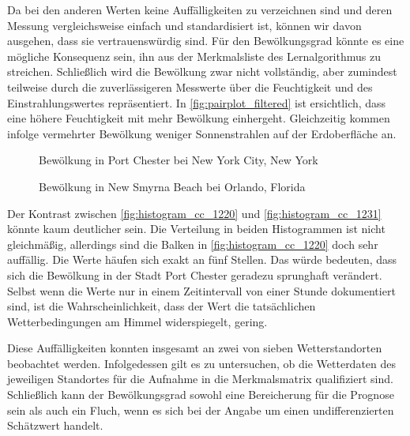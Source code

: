 \documentclass[12pt, a4paper]{article}
\begin{document}
Da bei den anderen Werten keine Auffälligkeiten zu verzeichnen sind und deren Messung vergleichsweise einfach und standardisiert ist, können wir davon ausgehen, dass sie vertrauenswürdig sind. Für den Bewölkungsgrad könnte es eine mögliche Konsequenz sein, ihn aus der Merkmalsliste des Lernalgorithmus zu streichen. Schließlich wird die Bewölkung zwar nicht vollständig, aber zumindest teilweise durch die zuverlässigeren Messwerte über die Feuchtigkeit und des Einstrahlungswertes repräsentiert. In \autoref{fig:pairplot_filtered} ist ersichtlich, dass eine höhere Feuchtigkeit mit mehr Bewölkung einhergeht. Gleichzeitig kommen infolge vermehrter Bewölkung weniger Sonnenstrahlen auf der Erdoberfläche an. 

\begin{figure}
\centering
\begin{minipage}[t]{0.45\linewidth}
\centering
\def\svgwidth{210pt}

\caption{Bewölkung in Port Chester bei New York City, New York}
\label{fig:histogram_cc_1220}
\end{minipage}
\hfill
\begin{minipage}[t]{0.45\linewidth}
\centering
\def\svgwidth{200pt}

\caption{Bewölkung in New Smyrna Beach bei Orlando, Florida}
\label{fig:histogram_cc_1231}
\end{minipage}
\end {figure}


Der Kontrast zwischen \autoref{fig:histogram_cc_1220} und \autoref{fig:histogram_cc_1231} könnte kaum deutlicher sein. Die Verteilung in beiden Histogrammen ist nicht gleichmäßig, allerdings sind die Balken in \autoref{fig:histogram_cc_1220} doch sehr auffällig. Die Werte häufen sich exakt an fünf Stellen. Das würde bedeuten, dass sich die Bewölkung in der Stadt Port Chester geradezu sprunghaft verändert. Selbst wenn die Werte nur in einem Zeitintervall von einer Stunde dokumentiert sind, ist die Wahrscheinlichkeit, dass der Wert die tatsächlichen Wetterbedingungen am Himmel widerspiegelt, gering.

Diese Auffälligkeiten konnten insgesamt an zwei von sieben Wetterstandorten beobachtet werden. Infolgedessen gilt es zu untersuchen, ob die Wetterdaten des jeweiligen Standortes für die Aufnahme in die Merkmalsmatrix qualifiziert sind. Schließlich kann der Bewölkungsgrad sowohl eine Bereicherung für die Prognose sein als auch ein Fluch, wenn es sich bei der Angabe um einen undifferenzierten Schätzwert handelt.
\end{document}
